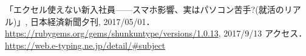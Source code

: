 \documentclass[a4j,twocolumn]{jsarticle}
\begin{document}
\begin{thebibliography}{9}
「エクセル使えない新入社員——スマホ影響、実はパソコン苦手?(就活のリアル)」, 日本経済新聞夕刊, 2017/05/01．
 \url{https://rubygems.org/gems/shunkuntype/versions/1.0.13}, 2017/9/13 アクセス．
 \url{https://web.e-typing.ne.jp/detail/#subject}

\end{thebibliography}
\end{document}
